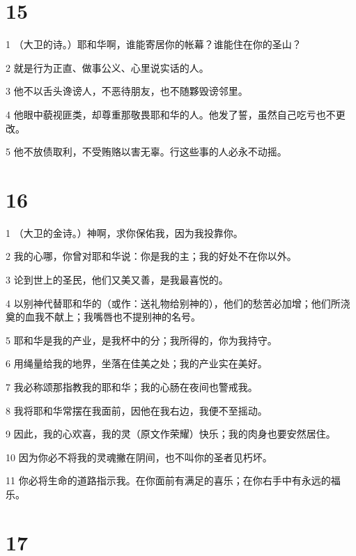 \chapter{15}

\par 1 （大卫的诗。）耶和华啊，谁能寄居你的帐幕？谁能住在你的圣山？
\par 2 就是行为正直、做事公义、心里说实话的人。
\par 3 他不以舌头谗谤人，不恶待朋友，也不随夥毁谤邻里。
\par 4 他眼中藐视匪类，却尊重那敬畏耶和华的人。他发了誓，虽然自己吃亏也不更改。
\par 5 他不放债取利，不受贿赂以害无辜。行这些事的人必永不动摇。

\chapter{16}

\par 1 （大卫的金诗。）神啊，求你保佑我，因为我投靠你。
\par 2 我的心哪，你曾对耶和华说：你是我的主；我的好处不在你以外。
\par 3 论到世上的圣民，他们又美又善，是我最喜悦的。
\par 4 以别神代替耶和华的（或作：送礼物给别神的），他们的愁苦必加增；他们所浇奠的血我不献上；我嘴唇也不提别神的名号。
\par 5 耶和华是我的产业，是我杯中的分；我所得的，你为我持守。
\par 6 用绳量给我的地界，坐落在佳美之处；我的产业实在美好。
\par 7 我必称颂那指教我的耶和华；我的心肠在夜间也警戒我。
\par 8 我将耶和华常摆在我面前，因他在我右边，我便不至摇动。
\par 9 因此，我的心欢喜，我的灵（原文作荣耀）快乐；我的肉身也要安然居住。
\par 10 因为你必不将我的灵魂撇在阴间，也不叫你的圣者见朽坏。
\par 11 你必将生命的道路指示我。在你面前有满足的喜乐；在你右手中有永远的福乐。

\chapter{17}

